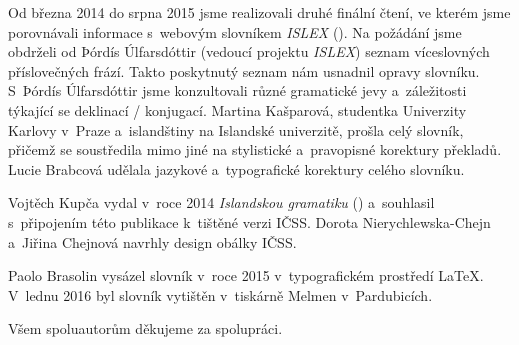 Od března 2014 do srpna 2015 jsme realizovali druhé finální čtení, ve kterém jsme porovnávali informace s~webovým slovníkem \textit{ISLEX} (\cite {int1}). 
Na požádání jsme obdrželi od Þórdís Úlfarsdóttir (vedoucí projektu \textit{ISLEX}) seznam víceslovných příslovečných frází. Takto poskytnutý seznam nám usnadnil opravy slovníku. 
S~Þórdís Úlfarsdóttir jsme konzultovali různé gramatické jevy a~záležitosti týkající se deklinací / konjugací.
Martina Kašparová, studentka Univerzity Karlovy v~Praze a~islandštiny na Islandské univerzitě, prošla celý slovník, přičemž se soustředila mimo jiné na stylistické a~pravopisné korektury překladů. 
Lucie Brabcová udělala jazykové a~typografické korektury celého slovníku.

Vojtěch Kupča vydal v~roce 2014 \textit{Islandskou gramatiku} (\cite {is77}) a~souhlasil s~připojením této publikace k~tištěné verzi IČSS.
Dorota Nierychlewska-Chejn a~Jiřina Chejnová navrhly design obálky IČSS.

Paolo Brasolin vysázel slovník v~roce 2015 v~typografickém prostředí {\LaTeX}. V~lednu 2016 byl slovník vytištěn v~tiskárně Melmen v~Pardubicích.

\blspace[5]

{\centering Všem spoluautorům děkujeme za spolupráci.\par}
